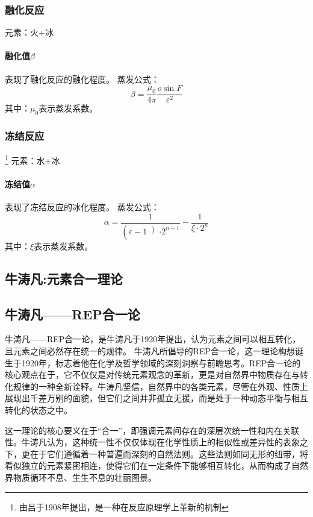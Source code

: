 \documentclass[12pt,a4paper]{article}%
\begin{document}
\subsubsection{融化反应}
元素：火+冰\\
\paragraph{融化值$ \beta   $} 表现了融化反应的融化程度。
蒸发公式：
\begin{equation}
	\beta = \frac{{{ \mu _0}}}{{4 \pi }} \frac{{o \sin F}}{{{\varepsilon ^2}}} 
\end{equation}
其中：$\mu _0$表示蒸发系数。

\subsubsection{冻结反应}\footnote[12]{由吕于1908年提出，是一种在反应原理学上革新的机制}
元素：水+冰\\
\paragraph{冻结值$\alpha $} 表现了冻结反应的冰化程度。
蒸发公式：
\begin{equation}
\alpha = \frac{1}{\left(\varepsilon -1 \left) \cdot 2^{n-1}\right. \right.}-\frac{1}{\xi  \cdot 2^{n}} 
\end{equation}
其中：$\xi$表示蒸发系数。
\begin{center}
\section{牛涛凡:元素合一理论}
\end{center}

\subsection{牛涛凡——REP合一论}
牛涛凡——REP合一论，是牛涛凡于1920年提出，认为元素之间可以相互转化，且元素之间必然存在统一的规律。
牛涛凡所倡导的REP合一论，这一理论构想诞生于1920年，标志着他在化学及哲学领域的深刻洞察与前瞻思考。REP合一论的核心观点在于，它不仅仅是对传统元素观念的革新，更是对自然界中物质存在与转化规律的一种全新诠释。牛涛凡坚信，自然界中的各类元素，尽管在外观、性质上展现出千差万别的面貌，但它们之间并非孤立无援，而是处于一种动态平衡与相互转化的状态之中。

这一理论的核心要义在于“合一”，即强调元素间存在的深层次统一性和内在关联性。牛涛凡认为，这种统一性不仅仅体现在化学性质上的相似性或差异性的表象之下，更在于它们遵循着一种普遍而深刻的自然法则。这些法则如同无形的纽带，将看似独立的元素紧密相连，使得它们在一定条件下能够相互转化，从而构成了自然界物质循环不息、生生不息的壮丽图景。
\end{document}
